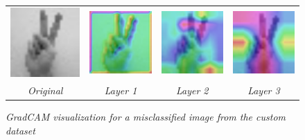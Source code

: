 \documentclass[a4paper]{article}
\begin{document}
\begin{figure}[t]
     \centering
     \begin{tabular}{cccc}
          \includegraphics[width=.2\linewidth]{graphics/gradcam/custom_dataset/v_original}&\includegraphics[width=.2\linewidth]{graphics/gradcam/custom_dataset/v_l1}&\includegraphics[width=.2\linewidth]{graphics/gradcam/custom_dataset/v_l3}&
          \includegraphics[width=.2\linewidth]{graphics/gradcam/custom_dataset/v_l5}\\
          \textit{Original} & \textit{Layer 1} & \textit{Layer 2} & \textit{Layer 3}
     \end{tabular}
     \caption{\textit{GradCAM visualization for a misclassified image from the custom dataset}}
     \label{fig:gradcam_custom}
\end{figure}
\end{document}
